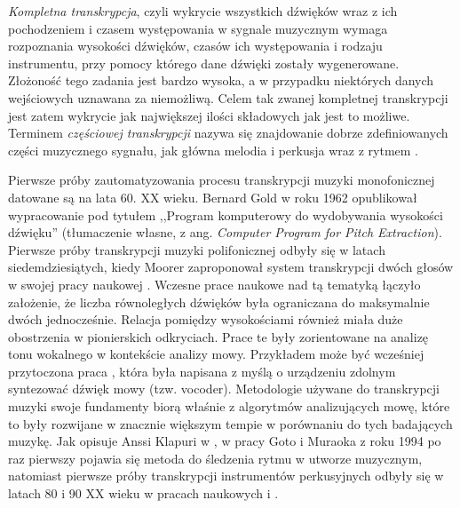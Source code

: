 \documentclass[12pt,a4paper,twoside]{mwart}
\begin{document}
\textit{Kompletna transkrypcja}, czyli wykrycie wszystkich dźwięków wraz z ich pochodzeniem i czasem występowania w sygnale muzycznym wymaga rozpoznania wysokości dźwięków, czasów ich występowania i rodzaju instrumentu, przy pomocy którego dane dźwięki zostały wygenerowane. Złożoność tego zadania jest bardzo wysoka, a w przypadku niektórych danych wejściowych uznawana za niemożliwą. Celem tak zwanej kompletnej transkrypcji jest zatem wykrycie jak największej ilości składowych jak jest to możliwe. Terminem \textit{częściowej transkrypcji} nazywa się znajdowanie dobrze zdefiniowanych części muzycznego sygnału, jak główna melodia i perkusja wraz z rytmem 
\cite[3-7]{Transcription:Anssi:SignalProcessingMethods}
.

Pierwsze próby zautomatyzowania procesu transkrypcji muzyki monofonicznej datowane są na lata 60. XX wieku. Bernard Gold w roku 1962 opublikował wypracowanie pod tytułem ,,Program komputerowy do wydobywania wysokości dźwięku'' \cite{Transcription:Gold:ComputerProgramForPitchExtraction} (tłumaczenie własne, z ang. \textit{Computer Program for Pitch Extraction}). Pierwsze próby transkrypcji muzyki polifonicznej odbyły się w latach siedemdziesiątych, kiedy Moorer zaproponował system transkrypcji dwóch głosów w swojej pracy naukowej \cite{Transcription:Moorer:OnTheTranscriptionOfMusicalSOundByComputer}. Wczesne prace naukowe nad tą tematyką łączyło założenie, że liczba równoległych dźwięków była ograniczana do maksymalnie dwóch jednocześnie. Relacja pomiędzy wysokościami również miała duże obostrzenia w pionierskich odkryciach. Prace te były zorientowane na analizę tonu wokalnego w kontekście analizy mowy. Przykładem może być wcześniej przytoczona praca \cite{Transcription:Gold:ComputerProgramForPitchExtraction}, która była napisana z myślą o urządzeniu zdolnym syntezować dźwięk mowy (tzw. vocoder). Metodologie używane do transkrypcji muzyki swoje fundamenty biorą właśnie z algorytmów analizujących mowę, które to były rozwijane w znacznie większym tempie w porównaniu do tych badających muzykę. Jak opisuje Anssi Klapuri w 
\cite[6]{Transcription:Anssi:SignalProcessingMethods}
, w pracy Goto i Muraoka z roku 1994 \cite{Transcription::FirstRythm} po raz pierwszy pojawia się metoda do śledzenia rytmu w utworze muzycznym, natomiast pierwsze próby transkrypcji instrumentów perkusyjnych odbyły się w latach 80 i 90 XX wieku w pracach naukowych 
\cite[99-104]{Transcription:Schloss:AutomaticTranscriptionOfPercussiveMusic} 
i 
\cite[77-84]{Transcription:Bilmes:TimingIsOfTHeEssence}
.
\end{document}
